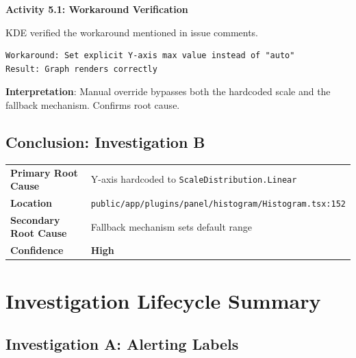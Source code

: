\documentclass[
    11pt,
    a4paper,
    oneside,
    parskip=full,
    headings=big,
    bibliography=totoc
]{scrartcl}
\newcommand{\code}[1]{\texttt{#1}}
\begin{document}
\begin{actionbox}
    \textbf{Activity 5.1: Workaround Verification}
    
    KDE verified the workaround mentioned in issue comments.
    
    \vspace{0.3cm}
    \begin{evidencebox}
    \begin{verbatim}
Workaround: Set explicit Y-axis max value instead of "auto"
Result: Graph renders correctly
    \end{verbatim}
    \end{evidencebox}
    
    \vspace{0.3cm}
    \textbf{Interpretation}: Manual override bypasses both the hardcoded scale 
    and the fallback mechanism. Confirms root cause.
\end{actionbox}

\subsection*{Conclusion: Investigation B}

\begingroup
\addtolength{\tabcolsep}{4pt}
\begin{tabular}{p{4cm}p{10cm}}
    \toprule
    \textbf{Primary Root Cause} & Y-axis hardcoded to \code{ScaleDistribution.Linear} \\
    \textbf{Location} & \code{public/app/plugins/panel/histogram/Histogram.tsx:152} \\
    \textbf{Secondary Root Cause} & Fallback mechanism sets default range \\
    \textbf{Confidence} & \textbf{High} \\
    \bottomrule
\end{tabular}
\endgroup

\newpage
\section{Investigation Lifecycle Summary}

\subsection*{Investigation A: Alerting Labels}
\end{document}
